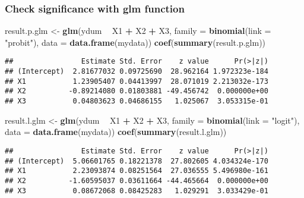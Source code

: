 \documentclass[]{article}
\newenvironment{Shaded}{\begin{snugshade}}{\end{snugshade}}
\newcommand{\KeywordTok}[1]{\textcolor[rgb]{0.13,0.29,0.53}{\textbf{#1}}}
\newcommand{\DataTypeTok}[1]{\textcolor[rgb]{0.13,0.29,0.53}{#1}}
\newcommand{\StringTok}[1]{\textcolor[rgb]{0.31,0.60,0.02}{#1}}
\newcommand{\OperatorTok}[1]{\textcolor[rgb]{0.81,0.36,0.00}{\textbf{#1}}}
\newcommand{\NormalTok}[1]{#1}
\begin{document}
\subsubsection{Check significance with glm
function}\label{check-significance-with-glm-function}

\begin{Shaded}
\begin{Highlighting}[]
\NormalTok{result.p.glm <-}\StringTok{ }\KeywordTok{glm}\NormalTok{(ydum }\OperatorTok{~}\StringTok{ }\NormalTok{X1 }\OperatorTok{+}\StringTok{ }\NormalTok{X2 }\OperatorTok{+}\StringTok{ }\NormalTok{X3, }\DataTypeTok{family =} \KeywordTok{binomial}\NormalTok{(}\DataTypeTok{link =} \StringTok{"probit"}\NormalTok{), }
                \DataTypeTok{data =} \KeywordTok{data.frame}\NormalTok{(mydata))}
\KeywordTok{coef}\NormalTok{(}\KeywordTok{summary}\NormalTok{(result.p.glm))}
\end{Highlighting}
\end{Shaded}

\begin{verbatim}
##                Estimate Std. Error    z value      Pr(>|z|)
## (Intercept)  2.81677032 0.09725690  28.962164 1.972323e-184
## X1           1.23905407 0.04413997  28.071019 2.213032e-173
## X2          -0.89214080 0.01803881 -49.456742  0.000000e+00
## X3           0.04803623 0.04686155   1.025067  3.053315e-01
\end{verbatim}

\begin{Shaded}
\begin{Highlighting}[]
\NormalTok{result.l.glm <-}\StringTok{ }\KeywordTok{glm}\NormalTok{(ydum }\OperatorTok{~}\StringTok{ }\NormalTok{X1 }\OperatorTok{+}\StringTok{ }\NormalTok{X2 }\OperatorTok{+}\StringTok{ }\NormalTok{X3, }\DataTypeTok{family =} \KeywordTok{binomial}\NormalTok{(}\DataTypeTok{link =} \StringTok{"logit"}\NormalTok{), }
                \DataTypeTok{data =} \KeywordTok{data.frame}\NormalTok{(mydata))}
\KeywordTok{coef}\NormalTok{(}\KeywordTok{summary}\NormalTok{(result.l.glm))}
\end{Highlighting}
\end{Shaded}

\begin{verbatim}
##                Estimate Std. Error    z value      Pr(>|z|)
## (Intercept)  5.06601765 0.18221378  27.802605 4.034324e-170
## X1           2.23093874 0.08251564  27.036555 5.496980e-161
## X2          -1.60595037 0.03611664 -44.465664  0.000000e+00
## X3           0.08672068 0.08425283   1.029291  3.033429e-01
\end{verbatim}
\end{document}
